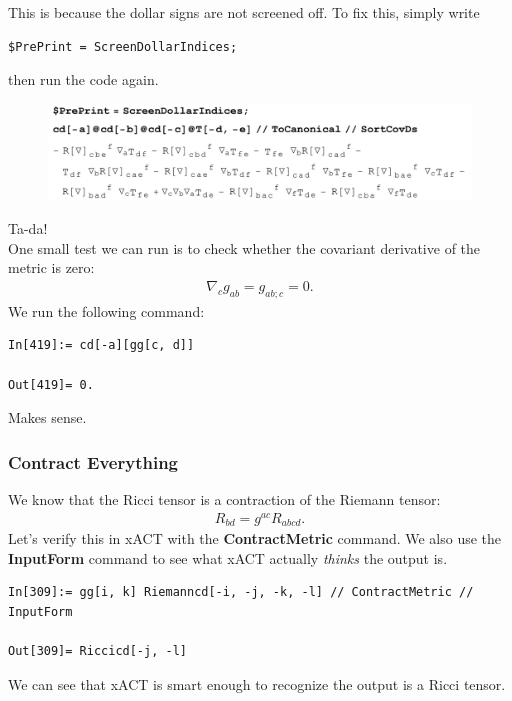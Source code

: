 \documentclass{book}
\theoremstyle{definition}
\begin{document}
This is because the dollar signs are not screened off. To fix this, simply write
\begin{lstlisting}
$PrePrint = ScreenDollarIndices;
\end{lstlisting}
then run the code again. 
\begin{figure}[!htb]
	\includegraphics[scale=0.25]{dollars}
\end{figure}
Ta-da!\\


One small test we can run is to check whether the covariant derivative of the metric is zero:
\begin{align}
\nabla_c g_{ab} = g_{ab;c} = 0.
\end{align}
We run the following command:
\begin{lstlisting}
In[419]:= cd[-a][gg[c, d]]

Out[419]= 0.
\end{lstlisting}
Makes sense.







\subsubsection{Contract Everything}


We know that the Ricci tensor is a contraction of the Riemann tensor:
\begin{align}
R_{bd} = g^{ac}R_{abcd}.
\end{align}
Let's verify this in xACT with the \textbf{ContractMetric} command. We also use the \textbf{InputForm} command to see what xACT actually \textit{thinks} the output is.
\begin{lstlisting}
In[309]:= gg[i, k] Riemanncd[-i, -j, -k, -l] // ContractMetric // InputForm

Out[309]= Riccicd[-j, -l]
\end{lstlisting}
We can see that xACT is smart enough to recognize the output is a Ricci tensor.\\
\end{document}
